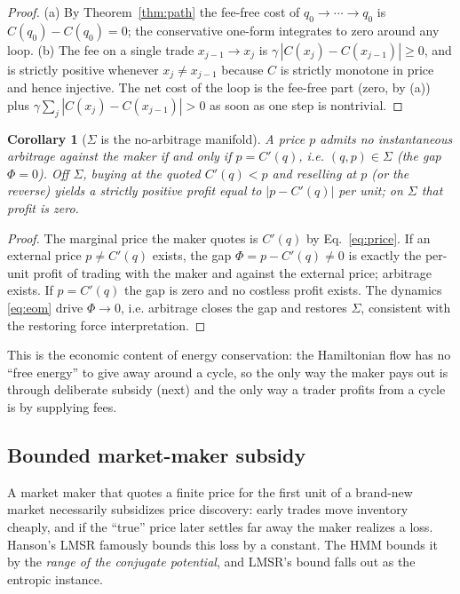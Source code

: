 \documentclass[11pt]{article}
\newtheorem{corollary}[theorem]{Corollary}
\begin{document}
\begin{proof}
(a) By Theorem~\ref{thm:path} the fee-free cost of $q_0\!\to\cdots\to q_0$ is
$C(q_0)-C(q_0)=0$; the conservative one-form integrates to zero around any loop.
(b) The fee on a single trade $x_{j-1}\!\to x_j$ is
$\gamma\,|C(x_j)-C(x_{j-1})|\ge 0$, and is strictly positive whenever
$x_j\neq x_{j-1}$ because $C$ is strictly monotone in price and hence injective.
The net cost of the loop is the fee-free part (zero, by (a)) plus
$\gamma\sum_j |C(x_j)-C(x_{j-1})| > 0$ as soon as one step is nontrivial.
\end{proof}

\begin{corollary}[$\Sigma$ is the no-arbitrage manifold]
\label{cor:noarb}
A price $p$ admits no instantaneous arbitrage against the maker if and only if
$p = C'(q)$, i.e. $(q,p)\in\Sigma$ (the gap $\Phi=0$). Off $\Sigma$, buying at the
quoted $C'(q)<p$ and reselling at $p$ (or the reverse) yields a strictly positive
profit equal to $|p - C'(q)|$ per unit; on $\Sigma$ that profit is zero.
\end{corollary}

\begin{proof}
The marginal price the maker quotes is $C'(q)$ by Eq.~\eqref{eq:price}. If an
external price $p\neq C'(q)$ exists, the gap $\Phi = p-C'(q)\neq 0$ is exactly the
per-unit profit of trading with the maker and against the external price; arbitrage
exists. If $p=C'(q)$ the gap is zero and no costless profit exists. The dynamics
\eqref{eq:eom} drive $\Phi\to 0$, i.e. arbitrage closes the gap and restores
$\Sigma$, consistent with the restoring force interpretation.
\end{proof}

This is the economic content of energy conservation: the Hamiltonian flow has no
``free energy'' to give away around a cycle, so the only way the maker pays out is
through deliberate subsidy (next) and the only way a trader profits from a cycle is
by supplying fees.

\subsection{Bounded market-maker subsidy}

A market maker that quotes a finite price for the first unit of a brand-new market
necessarily subsidizes price discovery: early trades move inventory cheaply, and if
the ``true'' price later settles far away the maker realizes a loss. Hanson's LMSR
famously bounds this loss by a constant. The HMM bounds it by the \emph{range of
the conjugate potential}, and LMSR's bound falls out as the entropic instance.
\end{document}
